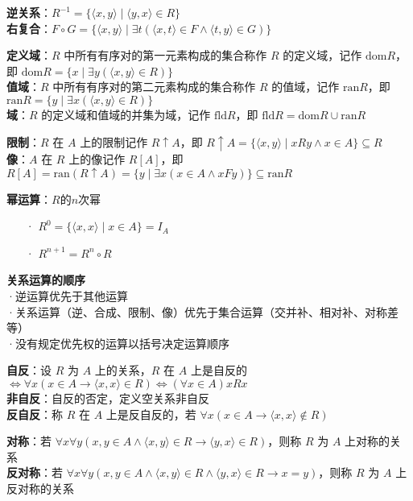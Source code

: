 	\textbf{逆关系}：$R^{-1} = \{ \langle x, y \rangle \mid \langle y, x \rangle \in R \}$\\
	\textbf{右复合}：$F \circ G = \{ \langle x, y \rangle \mid \exists t (\langle x, t \rangle \in F \land \langle t, y \rangle \in G) \}$
	
	\textbf{定义域}：$R$ 中所有有序对的第一元素构成的集合称作 $R$ 的定义域，记作 $\text{dom} R$，即 $\text{dom} R = \{ x \mid \exists y (\langle x, y \rangle \in R) \}$\\
	\textbf{值域}：$R$ 中所有有序对的第二元素构成的集合称作 $R$ 的值域，记作 $\text{ran} R$，即 $\text{ran} R = \{ y \mid \exists x (\langle x, y \rangle \in R) \}$\\
	\textbf{域}：$R$ 的定义域和值域的并集为域，记作 $\text{fld} R$，即 $\text{fld} R = \text{dom} R \cup \text{ran} R$
	
	\textbf{限制}：$R$ 在 $A$ 上的限制记作 $R \uparrow A$，即 $R \uparrow A = \{ \langle x, y \rangle \mid x R y \land x \in A \} \subseteq R$\\
	\textbf{像}：$A$ 在 $R$ 上的像记作 $R[A]$，即 $R[A] = \text{ran}(R \uparrow A) = \{ y \mid \exists x (x \in A \land x F y) \} \subseteq \text{ran} R$
	
	\textbf{幂运算}：$R$的$n$次幂
	\begin{itemize}
		\item[·] $R^0 = \{ \langle x, x \rangle \mid x \in A \} = I_A$
		\item[·] $R^{n+1} = R^n \circ R$
	\end{itemize}
	
	\textbf{关系运算的顺序}\\
	·逆运算优先于其他运算\\
	·关系运算（逆、合成、限制、像）优先于集合运算（交并补、相对补、对称差等）\\
	·没有规定优先权的运算以括号决定运算顺序
	
	\textbf{自反}：设 $R$ 为 $A$ 上的关系，$R$ 在 $A$ 上是自反的 $\Leftrightarrow \forall x (x \in A \rightarrow \langle x, x \rangle \in R) \Leftrightarrow (\forall x \in A) xRx$\\
	\textbf{非自反}：自反的否定，定义空关系非自反\\
	\textbf{反自反}：称 $R$ 在 $A$ 上是反自反的，若 $\forall x (x \in A \rightarrow \langle x, x \rangle \notin R)$
	
	\textbf{对称}：若 $\forall x \forall y (x, y \in A \land \langle x, y \rangle \in R \to \langle y, x \rangle \in R)$，则称 $R$ 为 $A$ 上对称的关系\\
	\textbf{反对称}：若 $\forall x \forall y (x, y \in A \land \langle x, y \rangle \in R \land \langle y, x \rangle \in R \to x=y)$，则称 $R$ 为 $A$ 上反对称的关系
	
